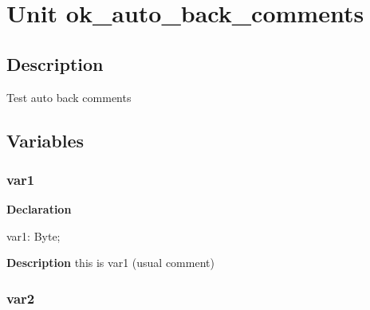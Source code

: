 \documentclass{report}
\newif\ifpdf
\begin{document}
\label{toc}\tableofcontents
\newpage
\newlength{\tmplength}
\chapter{Unit ok{\_}auto{\_}back{\_}comments}
\label{ok_auto_back_comments}
\section{Description}
Test auto back comments
\section{Variables}
\ifpdf
\subsection*{\large{\textbf{var1}}\normalsize\hspace{1ex}\hrulefill}
\else
\subsection*{var1}
\fi
\label{ok_auto_back_comments-var1}
\begin{list}{}{
\setlength{\itemindent}{0cm}
\setlength{\listparindent}{0cm}
\setlength{\leftmargin}{\evensidemargin}
\addtolength{\leftmargin}{\tmplength}
\settowidth{\labelsep}{X}
\addtolength{\leftmargin}{\labelsep}
\setlength{\labelwidth}{\tmplength}
}
\item[\textbf{Declaration}\hfill]
\ifpdf
\begin{flushleft}
\fi
\begin{ttfamily}
var1: Byte;\end{ttfamily}

\ifpdf
\end{flushleft}
\fi

\par
\item[\textbf{Description}]
this is var1 (usual comment)

\end{list}
\ifpdf
\subsection*{\large{\textbf{var2}}\normalsize\hspace{1ex}\hrulefill}
\else
\end{document}
